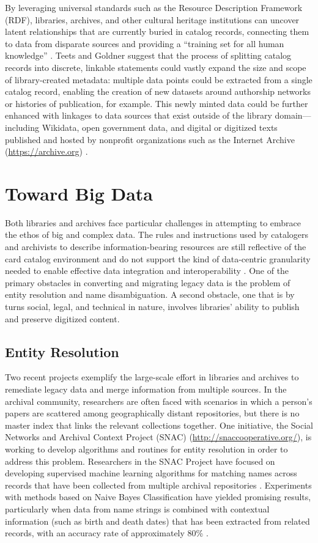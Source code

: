 \documentclass[sigconf]{acmart}
\begin{document}
By leveraging universal standards such as the Resource Description Framework (RDF), libraries, archives, and other cultural heritage institutions can uncover latent relationships that are currently buried in catalog records, connecting them to data from disparate sources and providing a ``training set for all human knowledge'' \cite[p.~430]{mT13}. Teets and Goldner suggest that the process of splitting catalog records into discrete, linkable statements could vastly expand the size and scope of library-created metadata: multiple data points could be extracted from a single catalog record, enabling the creation of new datasets around authorship networks or histories of publication, for example. This newly minted data could be further enhanced with linkages to data sources that exist outside of the library domain---including Wikidata, open government data, and digital or digitized texts published and hosted by nonprofit organizations such as the Internet Archive (\url{https://archive.org}) \cite{mT13}.

\section{Toward Big Data}
Both libraries and archives face particular challenges in attempting to embrace the ethos of big and complex data. The rules and instructions used by catalogers and archivists to describe information-bearing resources are still reflective of the card catalog environment and do not support the kind of data-centric granularity needed to enable effective data integration and interoperability \cite{rT02}. One of the primary obstacles in converting and migrating legacy data is the problem of entity resolution and name disambiguation. A second obstacle, one that is by turns social, legal, and technical in nature, involves libraries' ability to publish and preserve digitized content.

\subsection{Entity Resolution}
Two recent projects exemplify the large-scale effort in libraries and archives to remediate legacy data and merge information from multiple sources. In the archival community, researchers are often faced with scenarios in which a person's papers are scattered among geographically distant repositories, but there is no master index that links the relevant collections together. One initiative, the Social Networks and Archival Context Project (SNAC) (\url{http://snaccooperative.org/}), is working to develop algorithms and routines for entity resolution in order to address this problem. Researchers in the SNAC Project have focused on developing supervised machine learning algorithms for matching names across records that have been collected from multiple archival repositories \cite{rL11}. Experiments with methods based on Naive Bayes Classification have yielded promising results, particularly when data from name strings is combined with contextual information (such as birth and death dates) that has been extracted from related records, with an accuracy rate of approximately 80\% \cite{rL11}.
\end{document}
